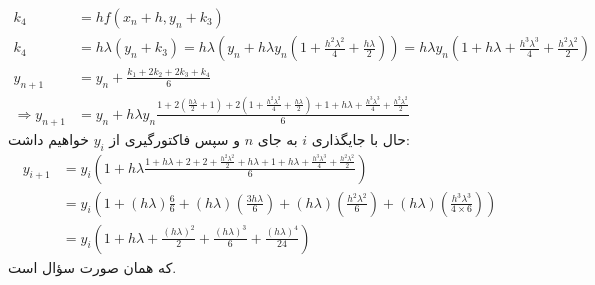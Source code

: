 {\begin{enumerate}
\begin{align*}
        k_4 &= hf(x_n + h, y_n + k_3) \\
        k_4 &= h \lambda (y_n + k_3) = h \lambda (y_n + h \lambda y_n (1 + \frac{h^2 \lambda^2}{4} + \frac{h \lambda}{2})) = h \lambda y_n (1 + h \lambda + \frac{h^3 \lambda^3}{4} + \frac{h^2 \lambda^2}{2}) \\
        y_{n + 1} &= y_{n} + \frac{k_1 + 2k_2 + 2k_3 + k_4}{6} \\
        \Rightarrow y_{n + 1} &= y_{n} + h \lambda y_{n} \frac{1 + 2(\frac{h \lambda}{2} + 1) + 2(1 + \frac{h^2 \lambda^2}{4} + \frac{h \lambda}{2}) + 1 + h \lambda + \frac{h^3 \lambda^3}{4} + \frac{h^2 \lambda^2}{2}}{6}
    \end{align*}
    حال با جایگذاری $i$
    به جای 
    $n$
    و سپس فاکتورگیری از 
    $y_i$
    خواهیم داشت:
    \begin{align*}
        y_{i + 1} &= y_i (1 + h\lambda \frac{1 + h\lambda + 2 + 2 + \frac{h^2 \lambda^2}{2} + h\lambda + 1 + h\lambda + \frac{h^3 \lambda^3}{4} + \frac{h^2 \lambda^2}{2}}{6}) \\
        &= y_i (1 + (h \lambda) \frac{6}{6} + (h \lambda) (\frac{3 h \lambda}{6}) + (h\lambda)(\frac{h^2 \lambda^2}{6}) + (h\lambda) (\frac{h^3 \lambda^3}{4 \times 6})) \\
        &= y_i (1 + h\lambda + \frac{(h \lambda)^2}{2} + \frac{(h \lambda)^3}{6} +\frac{(h\lambda)^4}{24})
    \end{align*}
    که همان صورت سؤال است.
\end{enumerate}
}

